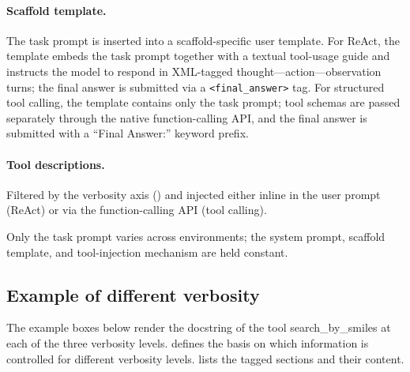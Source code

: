 \paragraph{Scaffold template.} The task prompt is inserted into a scaffold-specific user template. For ReAct, the template embeds the task prompt together with a textual tool-usage guide and instructs the model to respond in XML-tagged thought---action---observation turns; the final answer is submitted via a \texttt{<final\_answer>} tag. For structured tool calling, the template contains only the task prompt; tool schemas are passed separately through the native function-calling API, and the final answer is submitted with a \enquote{Final Answer:} keyword prefix.

\paragraph{Tool descriptions.} Filtered by the verbosity axis () and injected either inline in the user prompt (ReAct) or via the function-calling API (tool calling).

\noindent  Only the task prompt varies across environments; the system prompt, scaffold template, and tool-injection mechanism are held constant.


\subsection{Example of different verbosity}
\label{sec:verobisty_examples}
The example boxes below render the docstring of the tool search\_by\_smiles at each of the three verbosity levels.  defines the basis on which information is controlled for different verbosity levels.  lists the tagged sections and their content.

